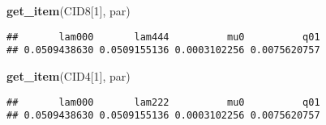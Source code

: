 \documentclass[
]{article}
\newenvironment{Shaded}{\begin{snugshade}}{\end{snugshade}}
\newcommand{\CommentTok}[1]{\textcolor[rgb]{0.56,0.35,0.01}{\textit{#1}}}
\newcommand{\DecValTok}[1]{\textcolor[rgb]{0.00,0.00,0.81}{#1}}
\newcommand{\FunctionTok}[1]{\textcolor[rgb]{0.13,0.29,0.53}{\textbf{#1}}}
\newcommand{\NormalTok}[1]{#1}
\newcommand{\SpecialCharTok}[1]{\textcolor[rgb]{0.81,0.36,0.00}{\textbf{#1}}}
\newcommand{\StringTok}[1]{\textcolor[rgb]{0.31,0.60,0.02}{#1}}
\begin{document}
\begin{Shaded}
\begin{Highlighting}[]
\FunctionTok{get\_item}\NormalTok{(CID8[}\DecValTok{1}\NormalTok{], }\StringTok{\textquotesingle{}par\textquotesingle{}}\NormalTok{)}
\end{Highlighting}
\end{Shaded}

\begin{verbatim}
##       lam000       lam444          mu0          q01 
## 0.0509438630 0.0509155136 0.0003102256 0.0075620757
\end{verbatim}

\begin{Shaded}
\begin{Highlighting}[]
\FunctionTok{get\_item}\NormalTok{(CID4[}\DecValTok{1}\NormalTok{], }\StringTok{\textquotesingle{}par\textquotesingle{}}\NormalTok{)}
\end{Highlighting}
\end{Shaded}

\begin{verbatim}
##       lam000       lam222          mu0          q01 
## 0.0509438630 0.0509155136 0.0003102256 0.0075620757
\end{verbatim}

\begin{Shaded}
\end{Shaded}
\end{document}
